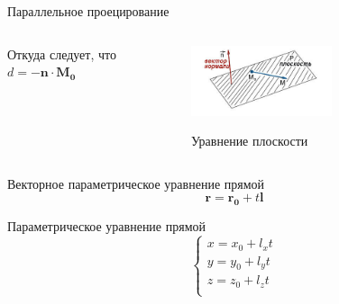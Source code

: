 \documentclass{beamer}
\begin{document}
\begin{frame}{Параллельное проецирование}
{\begin{columns}
\begin{column}{0.5\textwidth}
							Откуда следует, что
							$
								d = - \bm{n} \cdot \bm{M_0}
							$
			\end{column}
			\begin{column}{0.5\textwidth}
				\begin{figure} 
					\href{https://function-x.ru/image/plane_pic01.jpg}{
						\includegraphics[width=0.6\textwidth]{images/plane.jpg}}
					\caption{Уравнение плоскости}
				\end{figure}
			\end{column}
		\end{columns}

			Векторное параметрическое уравнение прямой
			\[
				\bm{r}=\bm{r_0}+t\bm{l}	
			\]
			
			Параметрическое уравнение прямой
			\[
				\begin{cases} x=x_0+l_xt \\
					y=y_0+l_yt \\
					z=z_0+l_zt \\
					\end{cases}
			\]
			}

	\end{frame}
\end{document}
